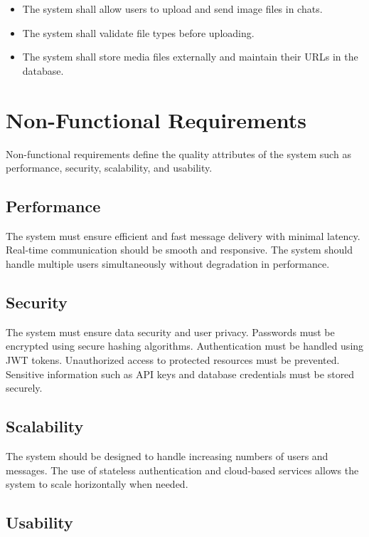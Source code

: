 \documentclass[12pt,a4paper]{report}
\begin{document}
\begin{itemize}
    \item The system shall allow users to upload and send image files in chats.
    \item The system shall validate file types before uploading.
    \item The system shall store media files externally and maintain their URLs in the database.
\end{itemize}

\section{Non-Functional Requirements}

Non-functional requirements define the quality attributes of the system such as performance, security, scalability, and usability.

\subsection{Performance}

The system must ensure efficient and fast message delivery with minimal latency. Real-time communication should be smooth and responsive. The system should handle multiple users simultaneously without degradation in performance.

\subsection{Security}

The system must ensure data security and user privacy. Passwords must be encrypted using secure hashing algorithms. Authentication must be handled using JWT tokens. Unauthorized access to protected resources must be prevented. Sensitive information such as API keys and database credentials must be stored securely.

\subsection{Scalability}

The system should be designed to handle increasing numbers of users and messages. The use of stateless authentication and cloud-based services allows the system to scale horizontally when needed.

\subsection{Usability}
\end{document}
